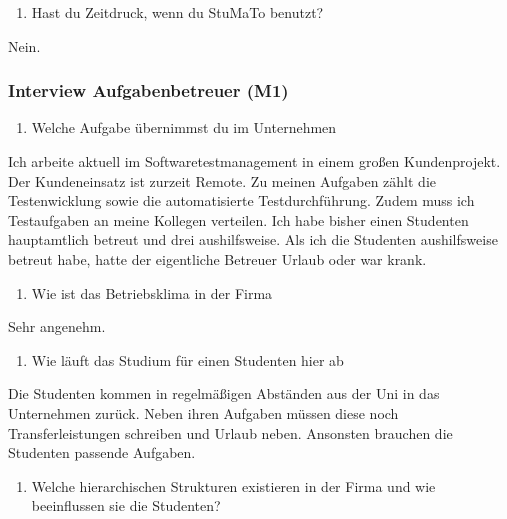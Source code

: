 \documentclass[
  12pt,
  ngerman,
  a4paper,
]{article}
\providecommand{\tightlist}{%
  \setlength{\itemsep}{0pt}\setlength{\parskip}{0pt}}
\begin{document}
\begin{enumerate}
\def\labelenumi{\arabic{enumi}.}
\setcounter{enumi}{16}
\tightlist
\item
  Hast du Zeitdruck, wenn du StuMaTo benutzt?
\end{enumerate}

Nein.

\hypertarget{interview-aufgabenbetreuer-m1}{%
\subsubsection{Interview Aufgabenbetreuer
(M1)}\label{interview-aufgabenbetreuer-m1}}

\begin{enumerate}
\def\labelenumi{\arabic{enumi}.}
\tightlist
\item
  Welche Aufgabe übernimmst du im Unternehmen
\end{enumerate}

Ich arbeite aktuell im Softwaretestmanagement in einem großen
Kundenprojekt. Der Kundeneinsatz ist zurzeit Remote. Zu meinen Aufgaben
zählt die Testenwicklung sowie die automatisierte Testdurchführung.
Zudem muss ich Testaufgaben an meine Kollegen verteilen. Ich habe bisher
einen Studenten hauptamtlich betreut und drei aushilfsweise. Als ich die
Studenten aushilfsweise betreut habe, hatte der eigentliche Betreuer
Urlaub oder war krank.

\begin{enumerate}
\def\labelenumi{\arabic{enumi}.}
\setcounter{enumi}{1}
\tightlist
\item
  Wie ist das Betriebsklima in der Firma
\end{enumerate}

Sehr angenehm.

\begin{enumerate}
\def\labelenumi{\arabic{enumi}.}
\setcounter{enumi}{2}
\tightlist
\item
  Wie läuft das Studium für einen Studenten hier ab
\end{enumerate}

Die Studenten kommen in regelmäßigen Abständen aus der Uni in das
Unternehmen zurück. Neben ihren Aufgaben müssen diese noch
Transferleistungen schreiben und Urlaub neben. Ansonsten brauchen die
Studenten passende Aufgaben.

\begin{enumerate}
\def\labelenumi{\arabic{enumi}.}
\setcounter{enumi}{3}
\tightlist
\item
  Welche hierarchischen Strukturen existieren in der Firma und wie
  beeinflussen sie die Studenten?
\end{enumerate}
\end{document}
